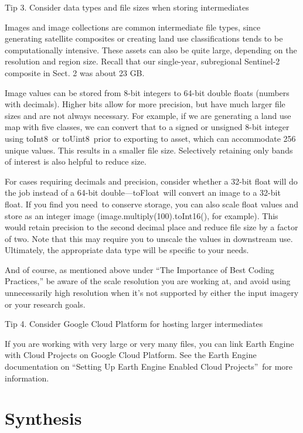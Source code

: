 \documentclass[
  letterpaper,
  DIV=11,
  numbers=noendperiod]{scrreprt}
\begin{document}
Tip 3. Consider data types and file sizes when storing intermediates

Images and image collections are common intermediate file types, since
generating satellite composites or creating land use classifications
tends to be computationally intensive. These assets can also be quite
large, depending on the resolution and region size. Recall that our
single-year, subregional Sentinel-2 composite in Sect. 2 was about 23
GB.

Image values can be stored from 8-bit integers to 64-bit double floats
(numbers with decimals). Higher bits allow for more precision, but have
much larger file sizes and are not always necessary. For example, if we
are generating a land use map with five classes, we can convert that to
a signed or unsigned 8-bit integer using toInt8~or toUint8~prior to
exporting to asset, which can accommodate 256 unique values. This
results in a smaller file size. Selectively retaining only bands of
interest is also helpful to reduce size.

For cases requiring decimals and precision, consider whether a 32-bit
float will do the job instead of a 64-bit double---toFloat~will convert
an image to a 32-bit float. If you find you need~to conserve storage,
you can also scale float values and store as an integer image
(image.multiply(100).toInt16(), for example). This would retain
precision to the second decimal place and reduce file size by a factor
of two. Note that this may require you to unscale the values in
downstream use. Ultimately, the appropriate data type will be specific
to your needs.

And of course, as mentioned above under ``The Importance of Best Coding
Practices,'' be aware of the scale resolution you are working at, and
avoid using unnecessarily high resolution when it's not supported by
either the input imagery or your research goals.

Tip 4. Consider Google Cloud Platform for hosting larger intermediates

If you are working with very large or very many files, you can link
Earth Engine with Cloud Projects on Google Cloud Platform. See the Earth
Engine documentation on ``Setting Up Earth Engine Enabled Cloud
Projects''~for more information.

\hypertarget{synthesis-19}{%
\section*{Synthesis}\label{synthesis-19}}
\end{document}
